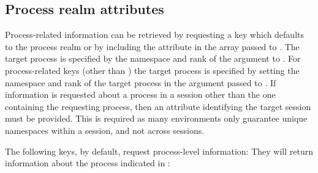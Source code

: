 \subsection{Process realm attributes}
\label{chap:api_rsvd_keys:prealm}


Process-related information can be retrieved by requesting a key which defaults
to the process realm or by including the  attribute
in the  array passed to .
The target process is specified by the namespace
and rank of the  argument to . 
For process-related keys (other than ) 
the target process is specified by setting the namespace and rank
of the target process in the  argument passed to .
If information
is requested about a process in a session other than the one containing the
requesting process, then an attribute identifying the target session must be
provided. This is required as many environments only guarantee unique
namespaces within a session, and not across sessions.

The following keys, by default, request process-level information:
They will return information about the process indicated in :

